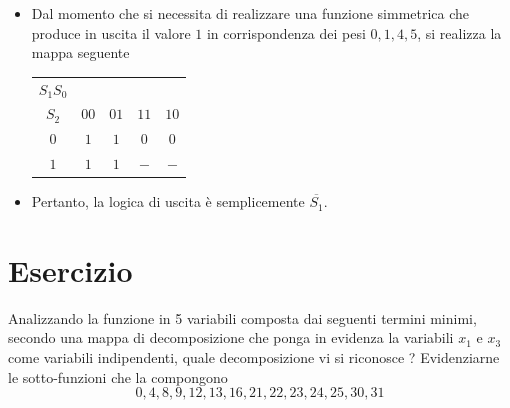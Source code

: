 \documentclass[a4paper]{extarticle}
\renewcommand\arraystretch{}
\begin{document}
\begin{itemize}
    \item Dal momento che si necessita di realizzare una funzione simmetrica che produce in uscita il valore $1$ in corrispondenza dei pesi $0,1,4,5$, si realizza la mappa seguente

    \noindent
    \begin{table}[H]
        \setlength{\tabcolsep}{4pt}
        \renewcommand{\arraystretch}{1}
        \centering
        \begin{tabular}{|c|c|c|c|c|}
            $S_1S_0$\\
            $S_2$ & $00$ & $01$ & $11$ & $10$\\
            \hline
            $0$ & $1$ & $1$ & $0$ & $0$\\
            $1$ & $1$ & $1$ & $-$ & $-$\\
        \end{tabular}
    \end{table}

    \item Pertanto, la logica di uscita è semplicemente $\overline{S_1}$.
\end{itemize}

\noindent
\section{Esercizio}
Analizzando la funzione in 5 variabili composta dai seguenti termini minimi, secondo una mappa di decomposizione che ponga in evidenza la variabili $x_1$ e $x_3$ come variabili indipendenti, quale decomposizione vi si riconosce ? Evidenziarne le sotto-funzioni che la compongono
\[0,4,8,9,12,13,16,21,22,23,24,25,30,31\]
\end{document}
